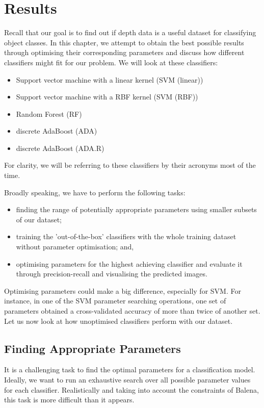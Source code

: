 \chapter{Results} \label{chap:results}

Recall that our goal is to find out if depth data is a useful dataset for classifying object classes. In this chapter, we attempt to obtain the best possible results through optimising their corresponding parameters and discuss how different classifiers might fit for our problem. We will look at these classifiers:

\begin{itemize}
  \item Support vector machine with a linear kernel (SVM (linear))
  \item Support vector machine with a RBF kernel (SVM (RBF))
  \item Random Forest (RF)
  \item discrete AdaBoost (ADA)
  \item discrete AdaBoost (ADA.R)
\end{itemize}

For clarity, we will be referring to these classifiers by their acronyms most of the time.

Broadly speaking, we have to perform the following tasks:

\begin{itemize}
  \item finding the range of potentially appropriate parameters using smaller subsets of our dataset;
  \item training the 'out-of-the-box' classifiers with the whole training dataset without parameter optimisation; and, 
  \item optimising parameters for the highest achieving classifier and evaluate it through precision-recall and visualising the predicted images.
\end{itemize}

Optimising parameters could make a big difference, especially for SVM. For instance, in one of the SVM parameter searching operations, one set of parameters obtained a cross-validated accuracy of more than twice of another set. Let us now look at how unoptimised classifiers perform with our dataset.


\newpage
\section{Finding Appropriate Parameters} \label{sec:res-params}
It is a challenging task to find the optimal parameters for a classification model. Ideally, we want to run an exhaustive search over all possible parameter values for each classifier. Realistically and taking into account the constraints of Balena, this task is more difficult than it appears. 

